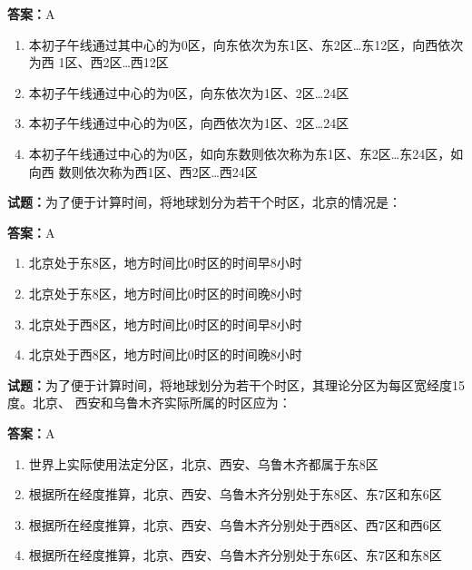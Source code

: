 \documentclass{ctexbook}
\begin{document}
\textbf{答案：}A 

\begin{enumerate}[leftmargin=3em]
  \item 本初子午线通过其中心的为0区，向东依次为东1区、东2区…东12区，向西依次为西
1区、西2区…西12区 

  \item 本初子午线通过中心的为0区，向东依次为1区、2区…24区 

  \item 本初子午线通过中心的为0区，向西依次为1区、2区…24区 

  \item 本初子午线通过中心的为0区，如向东数则依次称为东1区、东2区…东24区，如向西
数则依次称为西1区、西2区…西24区 

\end{enumerate}





\vspace{1em}

\textbf{试题：}为了便于计算时间，将地球划分为若干个时区，北京的情况是： 

\textbf{答案：}A 

\begin{enumerate}[leftmargin=3em]
  \item 北京处于东8区，地方时间比0时区的时间早8小时 

  \item 北京处于东8区，地方时间比0时区的时间晚8小时 

  \item 北京处于西8区，地方时间比0时区的时间早8小时 

  \item 北京处于西8区，地方时间比0时区的时间晚8小时 

\end{enumerate}





\vspace{1em}

\textbf{试题：}为了便于计算时间，将地球划分为若干个时区，其理论分区为每区宽经度15度。北京、
西安和乌鲁木齐实际所属的时区应为： 

\textbf{答案：}A 

\begin{enumerate}[leftmargin=3em]
  \item 世界上实际使用法定分区，北京、西安、乌鲁木齐都属于东8区 

  \item 根据所在经度推算，北京、西安、乌鲁木齐分别处于东8区、东7区和东6区 

  \item 根据所在经度推算，北京、西安、乌鲁木齐分别处于西8区、西7区和西6区 

  \item 根据所在经度推算，北京、西安、乌鲁木齐分别处于东6区、东7区和东8区 

\end{enumerate}
\end{document}
